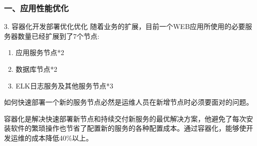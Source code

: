 \documentclass{beamer}
\begin{document}
\begin{frame}
  \frametitle{一、应用性能优化}
    \begin{block}{3. 容器化开发部署优化优化}
      随着业务的扩展，目前一个WEB应用所使用的必要服务器数量已经扩展到了7个节点:
      \begin{enumerate}
        \item 应用服务节点*2
        \item 数据库节点*2
        \item ELK日志服务及其他服务节点*3
      \end{enumerate}
      如何快速部署一个新的服务节点必然是运维人员在新增节点时必须要面对的问题\cite{fink2014docker}。

      容器化是解决快速部署新节点和持续交付新服务的最优解决方案，他避免了每次安装软件的繁琐操作也节省了配置新的服务的各种配置成本。通过容器化，能够使开发运维的成本降低40\%以上。
    \end{block}
\end{frame}
\end{document}
